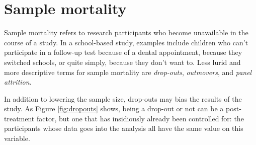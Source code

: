 \documentclass[a4paper]{tufte-book}\usepackage[]{graphicx}\usepackage[]{xcolor}
\begin{document}
\section{Sample mortality}
Sample mortality refers to research participants who become unavailable
in the course of a study.
In a school-based study, examples include children who can't participate
in a follow-up test because of a dental appointment, because they 
switched schools, or quite simply, because they don't want to.
Less lurid and more descriptive terms for sample mortality are
\emph{drop-outs}, \emph{outmovers}, and \emph{panel attrition}.

In addition to lowering the sample size, drop-outs may bias the results
of the study. As Figure \ref{fig:dropouts} shows,
being a drop-out or not can be a post-treatment factor,
but one that has insidiously already been controlled for:
the participants whose data goes into the analysis
all have the same value on this variable.
\end{document}
